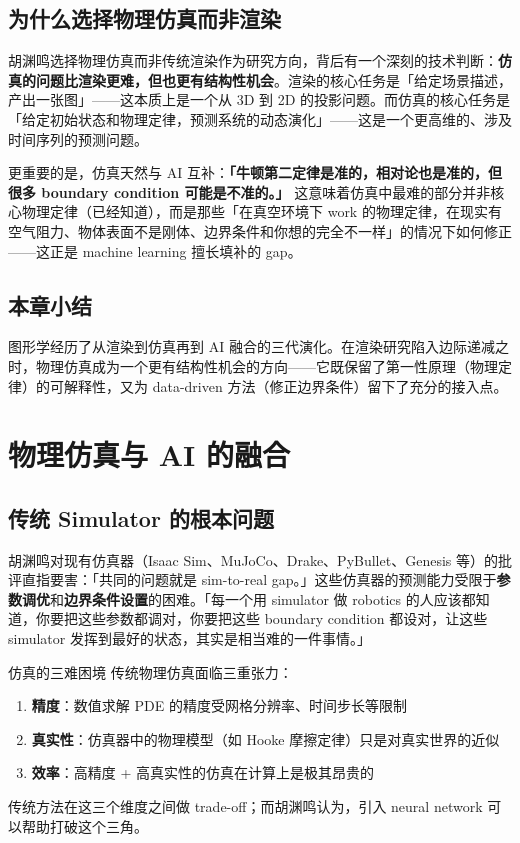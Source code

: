 \documentclass[a4paper]{article}
\begin{document}
\subsection{为什么选择物理仿真而非渲染}

胡渊鸣选择物理仿真而非传统渲染作为研究方向，背后有一个深刻的技术判断：\textbf{仿真的问题比渲染更难，但也更有结构性机会}。渲染的核心任务是「给定场景描述，产出一张图」——这本质上是一个从 3D 到 2D 的投影问题。而仿真的核心任务是「给定初始状态和物理定律，预测系统的动态演化」——这是一个更高维的、涉及时间序列的预测问题。

更重要的是，仿真天然与 AI 互补：\textbf{「牛顿第二定律是准的，相对论也是准的，但很多 boundary condition 可能是不准的。」} 这意味着仿真中最难的部分并非核心物理定律（已经知道），而是那些「在真空环境下 work 的物理定律，在现实有空气阻力、物体表面不是刚体、边界条件和你想的完全不一样」的情况下如何修正——这正是 machine learning 擅长填补的 gap。

\subsection{本章小结}
图形学经历了从渲染到仿真再到 AI 融合的三代演化。在渲染研究陷入边际递减之时，物理仿真成为一个更有结构性机会的方向——它既保留了第一性原理（物理定律）的可解释性，又为 data-driven 方法（修正边界条件）留下了充分的接入点。

\section{物理仿真与 AI 的融合}

\subsection{传统 Simulator 的根本问题}

胡渊鸣对现有仿真器（Isaac Sim、MuJoCo、Drake、PyBullet、Genesis 等）的批评直指要害：「共同的问题就是 sim-to-real gap。」这些仿真器的预测能力受限于\textbf{参数调优}和\textbf{边界条件设置}的困难。「每一个用 simulator 做 robotics 的人应该都知道，你要把这些参数都调对，你要把这些 boundary condition 都设对，让这些 simulator 发挥到最好的状态，其实是相当难的一件事情。」

\begin{importantbox}{仿真的三难困境}
传统物理仿真面临三重张力：
\begin{enumerate}
    \item \textbf{精度}：数值求解 PDE 的精度受网格分辨率、时间步长等限制
    \item \textbf{真实性}：仿真器中的物理模型（如 Hooke 摩擦定律）只是对真实世界的近似
    \item \textbf{效率}：高精度 + 高真实性的仿真在计算上是极其昂贵的
\end{enumerate}
传统方法在这三个维度之间做 trade-off；而胡渊鸣认为，引入 neural network 可以帮助打破这个三角。
\end{importantbox}
\end{document}
